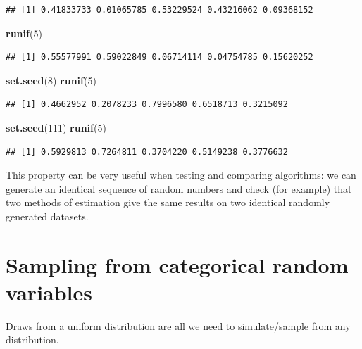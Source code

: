 \documentclass[
]{book}
\newenvironment{Shaded}{\begin{snugshade}}{\end{snugshade}}
\newcommand{\DecValTok}[1]{\textcolor[rgb]{0.00,0.00,0.81}{#1}}
\newcommand{\FunctionTok}[1]{\textcolor[rgb]{0.13,0.29,0.53}{\textbf{#1}}}
\newcommand{\NormalTok}[1]{#1}
\begin{document}
\begin{verbatim}
## [1] 0.41833733 0.01065785 0.53229524 0.43216062 0.09368152
\end{verbatim}

\begin{Shaded}
\begin{Highlighting}[]
\FunctionTok{runif}\NormalTok{(}\DecValTok{5}\NormalTok{)}
\end{Highlighting}
\end{Shaded}

\begin{verbatim}
## [1] 0.55577991 0.59022849 0.06714114 0.04754785 0.15620252
\end{verbatim}

\begin{Shaded}
\begin{Highlighting}[]
\FunctionTok{set.seed}\NormalTok{(}\DecValTok{8}\NormalTok{)}
\FunctionTok{runif}\NormalTok{(}\DecValTok{5}\NormalTok{)}
\end{Highlighting}
\end{Shaded}

\begin{verbatim}
## [1] 0.4662952 0.2078233 0.7996580 0.6518713 0.3215092
\end{verbatim}

\begin{Shaded}
\begin{Highlighting}[]
\FunctionTok{set.seed}\NormalTok{(}\DecValTok{111}\NormalTok{)}
\FunctionTok{runif}\NormalTok{(}\DecValTok{5}\NormalTok{)}
\end{Highlighting}
\end{Shaded}

\begin{verbatim}
## [1] 0.5929813 0.7264811 0.3704220 0.5149238 0.3776632
\end{verbatim}

This property can be very useful when testing and comparing algorithms:
we can generate an identical sequence of random numbers and check (for
example) that two methods of estimation give the same results on
two identical randomly generated datasets.

\section{Sampling from categorical random variables}\label{sampling-from-categorical-random-variables}

Draws from a uniform distribution are all we need to simulate/sample
from any distribution.
\end{document}

